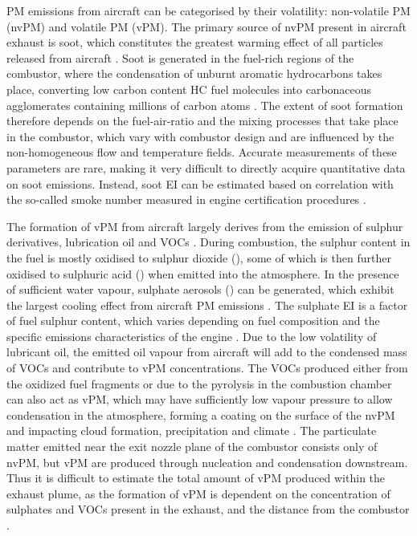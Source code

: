 PM emissions from aircraft can be categorised by their volatility: non-volatile PM (nvPM) and volatile PM (vPM). The primary source of nvPM present in aircraft exhaust is soot, which constitutes the greatest warming effect of all particles released from aircraft \cite{Gettelman2013}. Soot is generated in the fuel-rich regions of the combustor, where the condensation of unburnt aromatic hydrocarbons takes place, converting low carbon content HC fuel molecules into carbonaceous agglomerates containing millions of carbon atoms \cite{Ebbinghaus2001, Bockhorn1994}. The extent of soot formation therefore depends on the fuel-air-ratio and the mixing processes that take place in the combustor, which vary with combustor design and are influenced by the non-homogeneous flow and temperature fields. Accurate measurements of these parameters are rare, making it very difficult to directly acquire quantitative data on soot emissions. Instead, soot EI can be estimated based on correlation with the so-called smoke number measured in engine certification procedures \cite{Dopelheuer1998}.

The formation of vPM from aircraft largely derives from the emission of sulphur derivatives, lubrication oil and VOCs \cite{Wayson2012}. During combustion, the sulphur content in the fuel is mostly oxidised to sulphur dioxide (), some of which is then further oxidised to sulphuric acid () when emitted into the atmosphere. In the presence of sufficient water vapour, sulphate aerosols () can be generated, which exhibit the largest cooling effect from aircraft PM emissions \cite{IPCC1999}. The sulphate EI is a factor of fuel sulphur content, which varies depending on fuel composition and the specific emissions characteristics of the engine \cite{Schumann2002}. Due to the low volatility of lubricant oil, the emitted oil vapour from aircraft will add to the condensed mass of VOCs and contribute to vPM concentrations. The VOCs produced either from the oxidized fuel fragments or due to the pyrolysis in the combustion chamber can also act as vPM, which may have sufficiently low vapour pressure to allow condensation in the atmosphere, forming a coating on the surface of the nvPM and impacting cloud formation, precipitation and climate \cite{IPCC1999}. The particulate matter emitted near the exit nozzle plane of the combustor consists only of nvPM, but vPM are produced through nucleation and condensation downstream. Thus it is difficult to estimate the total amount of vPM produced within the exhaust plume, as the formation of vPM is dependent on the concentration of sulphates and VOCs present in the exhaust, and the distance from the combustor \cite{Masiol2014}.

